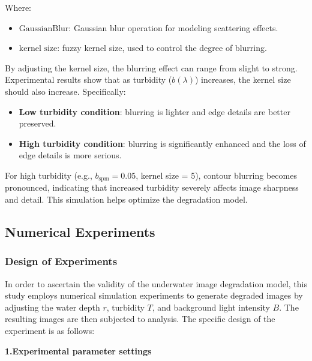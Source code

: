 \documentclass[withoutpreface,bwprint]{cumcmthesis}
\begin{document}
Where:

\begin{itemize}[itemindent=2em]
    \item $\text{GaussianBlur}$: Gaussian blur operation for modeling scattering effects. 

    \item $\text{kernel size}$: fuzzy kernel size, used to control the degree of blurring.
\end{itemize}

By adjusting the kernel size, the blurring effect can range from slight to strong. Experimental results show that as turbidity (\(b(\lambda)\)) increases, the kernel size should also increase. Specifically:

\begin{itemize}[itemindent=2em]
    \item \textbf{Low turbidity condition}: blurring is lighter and edge details are better preserved.  

    \item \textbf{High turbidity condition}: blurring is significantly enhanced and the loss of edge details is more serious.
\end{itemize}

For high turbidity (e.g., \(b_{\text{spm}} = 0.05\), kernel size = 5), contour blurring becomes pronounced, indicating that increased turbidity severely affects image sharpness and detail. This simulation helps optimize the degradation model.

\subsection{Numerical Experiments}

\subsubsection{Design of Experiments}

In order to ascertain the validity of the underwater image degradation model, this study employs numerical simulation experiments to generate degraded images by adjusting the water depth $r$, turbidity $T$, and background light intensity $B$. The resulting images are then subjected to analysis. The specific design of the experiment is as follows:

\textbf{1.Experimental parameter settings}
 
\end{document}
